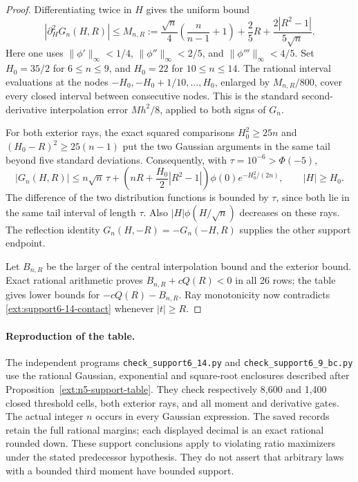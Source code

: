 \begin{proof}
Differentiating twice in $H$ gives the uniform bound
\[
 |\partial_H^2G_n(H,R)|\le
 M_{n,R}:=\frac{\sqrt n}{4}\left(\frac n{n-1}+1\right)
 +\frac25R+\frac{2|R^2-1|}{5\sqrt n}.
\]
Here one uses $\|\phi'\|_\infty<1/4$,
$\|\phi''\|_\infty<2/5$, and
$\|\phi'''\|_\infty<4/5$. Set $H_0=35/2$ for
$6\le n\le9$, and $H_0=22$ for $10\le n\le14$.
The rational interval evaluations at the nodes
$-H_0,-H_0+1/10,\ldots,H_0$, enlarged by $M_{n,R}/800$,
cover every closed interval between consecutive nodes. This is the
standard second-derivative interpolation error $Mh^2/8$, applied to
both signs of $G_n$.

For both exterior rays, the exact squared comparisons
$H_0^2\ge25n$ and $(H_0-R)^2\ge25(n-1)$ put the two
Gaussian arguments in the same tail beyond five standard deviations.
Consequently, with $\tau=10^{-6}>\Phi(-5)$,
\[
 |G_n(H,R)|\le n\sqrt n\,\tau+
 \left(nR+\frac{H_0}2|R^2-1|\right)
 \phi(0)e^{-H_0^2/(2n)},\qquad |H|\ge H_0.
\]
The difference of the two distribution functions is bounded by
$\tau$, since both lie in the same tail interval of length $\tau$.
Also $|H|\phi(H/\sqrt n)$ decreases on these rays.
The reflection identity $G_n(H,-R)=-G_n(-H,R)$ supplies the other
support endpoint.

Let $B_{n,R}$ be the larger of the central interpolation bound and
the exterior bound. Exact rational arithmetic proves
$B_{n,R}+cQ(R)<0$ in all 26 rows; the table gives lower bounds for
$-cQ(R)-B_{n,R}$. Ray monotonicity now contradicts
\eqref{ext:support6-14-contact} whenever $|t|\ge R$.
\end{proof}

\paragraph{Reproduction of the table.}
The independent programs \texttt{check\_support6\_14.py} and
\texttt{check\_support6\_9\_bc.py} use the rational Gaussian,
exponential and square-root enclosures described after
Proposition~\ref{ext:n5-support-table}. They check respectively
8,600 and 1,400 closed threshold cells, both exterior rays, and all
moment and derivative gates. The actual integer $n$ occurs in every
Gaussian expression. The saved records retain the full rational
margins; each displayed decimal is an exact rational rounded down.
These support conclusions apply to violating ratio maximizers under
the stated predecessor hypothesis. They do not assert that arbitrary
laws with a bounded third moment have bounded support.


